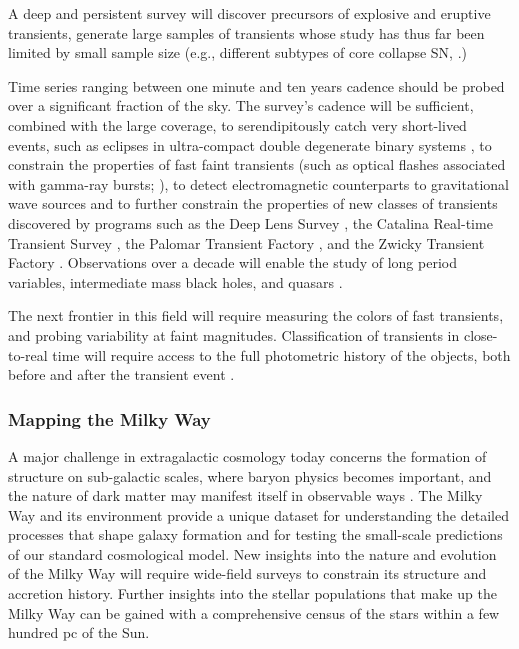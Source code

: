 A deep and persistent survey will discover precursors of explosive and
eruptive transients, generate large samples of transients whose study
has thus far been limited by small sample size (e.g., different
subtypes of core collapse SN, \citealt{2014ApJS..213...19B}.)

Time series ranging between one minute and ten years cadence should be
probed over a significant fraction of the sky. The survey's cadence
will be sufficient, combined with the large coverage, to
serendipitously catch very short-lived events, such as eclipses in
ultra-compact double degenerate binary systems \citep{2005AJ....130.2230A},
to constrain the properties of fast faint transients (such as optical
flashes associated with gamma-ray bursts; \citealt{2008AN....329..284B}), to
detect electromagnetic counterparts to gravitational wave sources
\citep{2013ApJ...767..124N,2018ApJ...852L...3S} and to further constrain the
properties of new classes of transients discovered by programs such as
the Deep Lens Survey \citep{2004ApJ...611..418B}, the Catalina Real-time
Transient Survey \citep{2009ApJ...696..870D}, the Palomar Transient Factory
\citep{2009PASP..121.1395L}, and the Zwicky Transient Factory \citep{2014htu..conf...27B}. Observations
over a decade will enable the study of long period variables, intermediate mass
black holes, and quasars \citep{2007ApJ...659..997K,2010ApJ...721.1014M,2014MNRAS.439..703G,2016JCAP...11..042C}.


The next frontier
in this field will require measuring the colors of fast transients,
and probing variability at faint magnitudes. Classification of transients in
close-to-real time will require access to the full photometric history
of the objects, both before and after the transient event
\citep[e.g.,][]{2011BASI...39..387M}.

\subsubsection{Mapping the Milky Way}

A major challenge in extragalactic cosmology today concerns the formation of structure on sub-galactic scales, where
baryon physics becomes important, and the nature of dark matter may manifest itself in observable ways \citep[e.g.][]{2015PNAS..11212249W}.
The Milky Way and its environment provide a unique dataset for understanding the detailed processes that
shape galaxy formation and for testing the small-scale predictions of
our standard cosmological model. New insights into the nature and
evolution of the Milky Way will require wide-field surveys to constrain
its structure and accretion history.  Further insights into the stellar
populations that make up the Milky Way can be gained with a comprehensive census of the stars
within a few hundred pc of the Sun.

